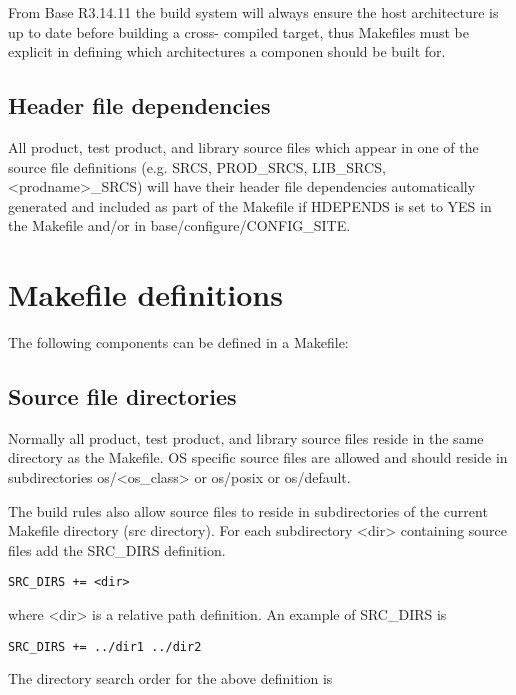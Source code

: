 From Base R3.14.11 the build system will always ensure the host architecture is up to date before building a cross-
compiled target, thus Makefiles must be explicit in defining which architectures a componen should be built for.

\subsection{Header file dependencies}

All product, test product, and library source files which appear in one of the source file definitions (e.g. SRCS, 
PROD\_SRCS, LIB\_SRCS, \textless{}prodname\textgreater{}\_SRCS) will have their header file dependencies automatically generated and 
included as part of the Makefile if HDEPENDS is set to YES in the Makefile and/or in base/configure/CONFIG\_SITE.

\section{Makefile definitions}

The following components can be defined in a Makefile:

\subsection{Source file directories}

Normally all product, test product, and library source files reside in the same directory as the Makefile. OS specific source 
files are allowed and should reside in subdirectories os/\textless{}os\_class\textgreater{} or os/posix or os/default. 

The build rules also allow source files to reside in subdirectories of the current Makefile directory (src directory). For 
each subdirectory \textless{}dir\textgreater{} containing source files add the SRC\_DIRS definition. 

\begin{verbatim}SRC_DIRS += <dir>
\end{verbatim}where \textless{}dir\textgreater{} is a relative path definition. An example of SRC\_DIRS is

\begin{verbatim}SRC_DIRS += ../dir1 ../dir2
\end{verbatim}The directory search order for the above definition is 

